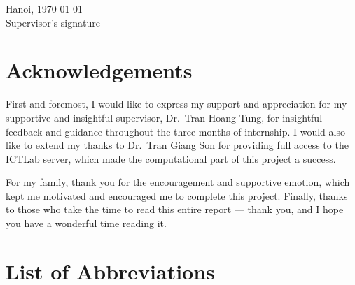 \documentclass[12pt,a4paper]{article}
\begin{document}
\vspace{1.4cm}
\noindent
\begin{minipage}{0.5\linewidth}
\end{minipage}
\hfill
\begin{minipage}{0.45\linewidth}
\centering
Hanoi, \today\\[1.6cm]
Supervisor's signature
\end{minipage}

\newpage
\section*{Acknowledgements}

First and foremost, I would like to express my support and appreciation for my
supportive and insightful supervisor, Dr.\ Tran Hoang Tung, for insightful
feedback and guidance throughout the three months of internship. I would also
like to extend my thanks to Dr.\ Tran Giang Son for providing full access to the
ICTLab server, which made the computational part of this project a success.

For my family, thank you for the encouragement and supportive emotion, which
kept me motivated and encouraged me to complete this project. Finally, thanks to
those who take the time to read this entire report --- thank you, and I hope you
have a wonderful time reading it.

\newpage
\section*{List of Abbreviations}
\end{document}
